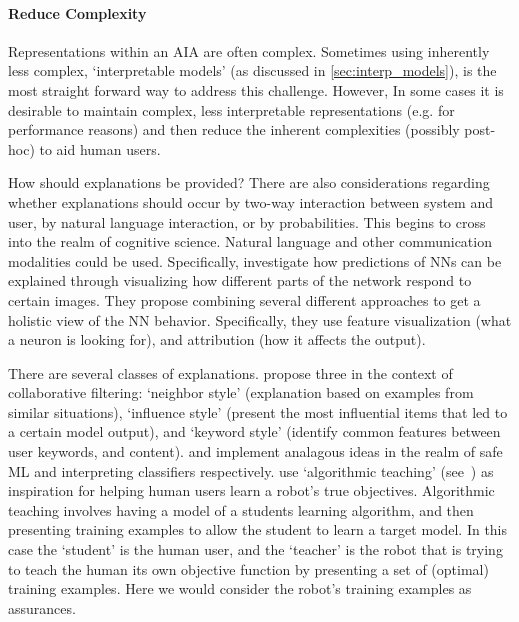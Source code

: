 \paragraph{Reduce Complexity} \label{sec:reduce_complexity}
Representations within an AIA are often complex. Sometimes using inherently less complex, `interpretable models' (as discussed in \ref{sec:interp_models}), is the most straight forward way to address this challenge. However, In some cases it is desirable to maintain complex, less interpretable representations (e.g. for performance reasons) and then reduce the inherent complexities (possibly post-hoc) to aid human users.

How should explanations be provided? There are also considerations regarding whether explanations should occur by two-way interaction between system and user, by natural language interaction, or by probabilities. This begins to cross into the realm of cognitive science. Natural language  \cite{Hayes2017-nt} and other communication modalities could be used. Specifically, \citet{Olah2018-rp} investigate how predictions of NNs can be explained through visualizing how different parts of the network respond to certain images. They propose combining several different approaches to get a holistic view of the NN behavior. Specifically, they use feature visualization (what a neuron is looking for), and attribution (how it affects the output).

There are several classes of explanations. \citet{Abdollahi2018-uw} propose three in the context of collaborative filtering: `neighbor style' (explanation based on examples from similar situations), `influence style' (present the most influential items that led to a certain model output), and `keyword style' (identify common features between user keywords, and content). \citet{Otte2013-oo} and \citet{Ribeiro2016-uc} implement analagous ideas in the realm of safe ML and interpreting classifiers respectively. 
\citet{Huang2017-lk} use `algorithmic teaching' (see~\cite{Balbach2009-jw}) as inspiration for helping human users learn a robot's true objectives. Algorithmic teaching involves having a model of a students learning algorithm, and then presenting training examples to allow the student to learn a target model. In this case the `student' is the human user, and the `teacher' is the robot that is trying to teach the human its own objective function by presenting a set of (optimal) training examples. Here we would consider the robot's training examples as assurances.


